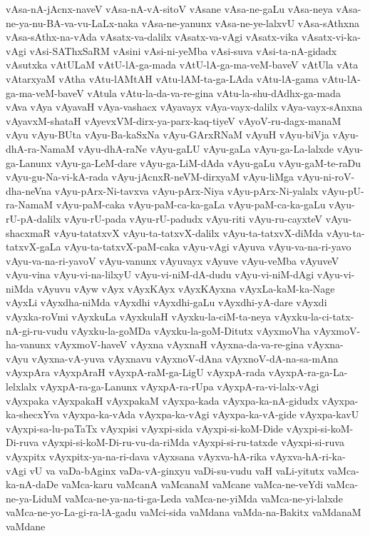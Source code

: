 {vAsa-nA-jAcnx-naveV
vAsa-nA-vA-sitoV
vAsane
vAsa-ne-gaLu
vAsa-neya
vAsa-ne-ya-nu-BA-va-vu-LaLx-naka
vAsa-ne-yanunx
vAsa-ne-ye-lalxvU
vAsa-sAthxna
vAsa-sAthx-na-vAda
vAsatx-va-dalilx
vAsatx-va-vAgi
vAsatx-vika
vAsatx-vi-ka-vAgi
vAsi-SAThxSaRM
vAsini
vAsi-ni-yeMba
vAsi-suva
vAsi-ta-nA-gidadx
vAsutxka
vAtULaM
vAtU-lA-ga-mada
vAtU-lA-ga-ma-veM-baveV
vAtUla
vAta
vAtarxyaM
vAtha
vAtu-lAMtAH
vAtu-lAM-ta-ga-LAda
vAtu-lA-gama
vAtu-lA-ga-ma-veM-baveV
vAtula
vAtu-la-da-va-re-gina
vAtu-la-shu-dAdhx-ga-mada
vAva
vAya
vAyavaH
vAya-vashacx
vAyavayx
vAya-vayx-dalilx
vAya-vayx-sAnxna
vAyavxM-shataH
vAyevxVM-dirx-ya-parx-kaq-tiyeV
vAyoV-ru-dagx-manaM
vAyu
vAyu-BUta
vAyu-Ba-kaSxNa
vAyu-GArxRNaM
vAyuH
vAyu-biVja
vAyu-dhA-ra-NamaM
vAyu-dhA-raNe
vAyu-gaLU
vAyu-gaLa
vAyu-ga-La-lalxde
vAyu-ga-Lanunx
vAyu-ga-LeM-dare
vAyu-ga-LiM-dAda
vAyu-gaLu
vAyu-gaM-te-raDu
vAyu-gu-Na-vi-kA-rada
vAyu-jAcnxR-neVM-dirxyaM
vAyu-liMga
vAyu-ni-roV-dha-neVna
vAyu-pArx-Ni-tavxva
vAyu-pArx-Niya
vAyu-pArx-Ni-yalalx
vAyu-pU-ra-NamaM
vAyu-paM-caka
vAyu-paM-ca-ka-gaLa
vAyu-paM-ca-ka-gaLu
vAyu-rU-pA-dalilx
vAyu-rU-pada
vAyu-rU-padudx
vAyu-riti
vAyu-ru-cayxteV
vAyu-shacxmaR
vAyu-tatatxvX
vAyu-ta-tatxvX-dalilx
vAyu-ta-tatxvX-diMda
vAyu-ta-tatxvX-gaLa
vAyu-ta-tatxvX-paM-caka
vAyu-vAgi
vAyuva
vAyu-va-na-ri-yavo
vAyu-va-na-ri-yavoV
vAyu-vanunx
vAyuvayx
vAyuve
vAyu-veMba
vAyuveV
vAyu-vina
vAyu-vi-na-lilxyU
vAyu-vi-niM-dA-dudu
vAyu-vi-niM-dAgi
vAyu-vi-niMda
vAyuvu
vAyw
vAyx
vAyxKAyx
vAyxKAyxna
vAyxLa-kaM-ka-Nage
vAyxLi
vAyxdha-niMda
vAyxdhi
vAyxdhi-gaLu
vAyxdhi-yA-dare
vAyxdi
vAyxka-roVmi
vAyxkuLa
vAyxkulaH
vAyxku-la-ciM-ta-neya
vAyxku-la-ci-tatx-nA-gi-ru-vudu
vAyxku-la-goMDa
vAyxku-la-goM-Ditutx
vAyxmoVha
vAyxmoV-ha-vanunx
vAyxmoV-haveV
vAyxna
vAyxnaH
vAyxna-da-va-re-gina
vAyxna-vAyu
vAyxna-vA-yuva
vAyxnavu
vAyxnoV-dAna
vAyxnoV-dA-na-sa-mAna
vAyxpAra
vAyxpAraH
vAyxpA-raM-ga-LigU
vAyxpA-rada
vAyxpA-ra-ga-La-lelxlalx
vAyxpA-ra-ga-Lanunx
vAyxpA-ra-rUpa
vAyxpA-ra-vi-lalx-vAgi
vAyxpaka
vAyxpakaH
vAyxpakaM
vAyxpa-kada
vAyxpa-ka-nA-gidudx
vAyxpa-ka-shecxYva
vAyxpa-ka-vAda
vAyxpa-ka-vAgi
vAyxpa-ka-vA-gide
vAyxpa-kavU
vAyxpi-sa-lu-paTaTx
vAyxpisi
vAyxpi-sida
vAyxpi-si-koM-Dide
vAyxpi-si-koM-Di-ruva
vAyxpi-si-koM-Di-ru-vu-da-riMda
vAyxpi-si-ru-tatxde
vAyxpi-si-ruva
vAyxpitx
vAyxpitx-ya-na-ri-dava
vAyxsana
vAyxva-hA-rika
vAyxva-hA-ri-ka-vAgi
vU
va
vaDa-bAginx
vaDa-vA-ginxyu
vaDi-su-vudu
vaH
vaLi-yitutx
vaMca-ka-nA-daDe
vaMca-karu
vaMcanA
vaMcanaM
vaMcane
vaMca-ne-veYdi
vaMca-ne-ya-LiduM
vaMca-ne-ya-na-ti-ga-Leda
vaMca-ne-yiMda
vaMca-ne-yi-lalxde
vaMca-ne-yo-La-gi-ra-lA-gadu
vaMci-sida
vaMdana
vaMda-na-Bakitx
vaMdanaM
vaMdane
}
